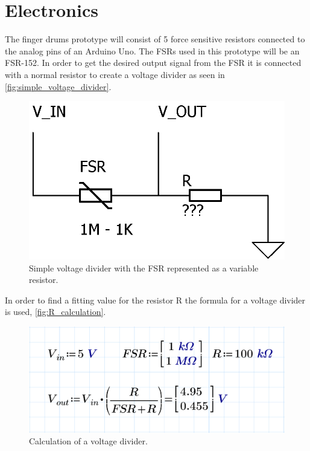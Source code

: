 \section{Electronics}
\label{electronics}
The finger drums prototype will consist of 5 force sensitive resistors connected to the analog pins of an Arduino Uno. The FSRs used in this prototype will be an FSR-152. In order to get the desired output signal from the FSR it is connected with a normal resistor to create a voltage divider as seen in \autoref{fig:simple_voltage_divider}. 
\begin{figure}
\centering
\includegraphics[scale=1.5]{Figure/simple_voltage_divider.png}
\caption{Simple voltage divider with the FSR represented as a variable resistor. }
\label{fig:simple_voltage_divider}
\end{figure}

In order to find a fitting value for the resistor R the formula for a voltage divider is used, \autoref{fig:R_calculation}.
\begin{figure}
\centering
\includegraphics[scale=0.15]{Figure/R_calculation.png}
\caption{Calculation of a voltage divider.}
\label{fig:R_calculation}
\end{figure}

